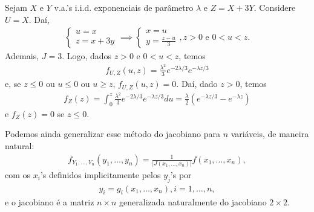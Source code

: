 \documentclass[../Notas.tex]{subfiles}
\begin{document}
\begin{example}
Sejam $X$ e $Y$ v.a.'s i.i.d. exponenciais de parâmetro $\lambda$ e $Z = X+3Y$. Considere $U = X$. Daí,
\begin{align*}
    \begin{cases}
    u = x \\
    z = x + 3y
    \end{cases}\implies
    \begin{cases}
    x = u \\
    y = \frac{z-u}{3}
    \end{cases}, z > 0 \text{ e } 0 < u < z.
\end{align*}
Ademais, $J = 3$. Logo, dados $z>0$ e $0<u<z$, temos
\begin{align*}
    f_{U,Z}(u,z) = \frac{\lambda^2}{3} e^{-2\lambda/3}e^{-\lambda z/3}
\end{align*}
e, se $z\leq 0$ ou $u \leq 0$ ou $u\geq z$, $f_{U,Z}(u,z) = 0$. Daí, dado $z>0$, temos
\begin{align*}
    f_Z(z) = \int_0^z \frac{\lambda^2}{3} e^{-2\lambda/3}e^{-\lambda z/3} du = \frac{\lambda}{2}(e^{-\lambda z/3} - e^{-\lambda z})
\end{align*}
e $f_Z(z) = 0$ se $z\leq 0$.
\end{example}

\begin{remark}
Podemos ainda generalizar esse método do jacobiano para $n$ variáveis, de maneira natural:
\begin{align*}
    f_{Y_1, \dots, Y_n}(y_1, \dots, y_n) = \frac{1}{|J(x_1, \dots, x_n)|}f(x_1, \dots, x_n),
\end{align*}
com os $x_i$'s definidos implicitamente pelos $y_j$'s por
\begin{align*}
    y_i = g_i(x_1, \dots, x_n), i = 1,\dots,n,
\end{align*}
e o jacobiano é a matriz $n\times n$ generalizada naturalmente do jacobiano $2\times 2$.
\end{remark}
\end{document}
